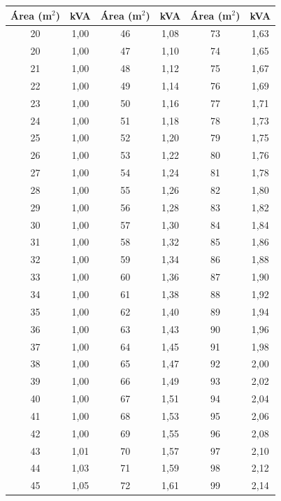 \documentclass[12pt,openright,oneside,a4paper,brazil]{abntex2}
\begin{document}
\begin{table}[H]
\begin{tabular}{c| c | c | c | c | c}
        \textbf{Área (m$^2$)} & \textbf{kVA} & \textbf{Área (m$^2$)} & \textbf{kVA} & \textbf{Área (m$^2$)} & \textbf{kVA} \rule{0pt}{15pt} \\
        \hline
        20 & 1,00 & 46 & 1,08 & 73 & 1,63 \\ \hline
        20 & 1,00 & 47 & 1,10 & 74 & 1,65 \\ \hline
        21 & 1,00 & 48 & 1,12 & 75 & 1,67 \\ \hline
        22 & 1,00 & 49 & 1,14 & 76 & 1,69 \\ \hline
        23 & 1,00 & 50 & 1,16 & 77 & 1,71 \\ \hline
        24 & 1,00 & 51 & 1,18 & 78 & 1,73 \\ \hline
        25 & 1,00 & 52 & 1,20 & 79 & 1,75 \\ \hline
        26 & 1,00 & 53 & 1,22 & 80 & 1,76 \\ \hline
        27 & 1,00 & 54 & 1,24 & 81 & 1,78 \\ \hline
        28 & 1,00 & 55 & 1,26 & 82 & 1,80 \\ \hline
        29 & 1,00 & 56 & 1,28 & 83 & 1,82 \\ \hline
        30 & 1,00 & 57 & 1,30 & 84 & 1,84 \\ \hline
        31 & 1,00 & 58 & 1,32 & 85 & 1,86 \\ \hline
        32 & 1,00 & 59 & 1,34 & 86 & 1,88 \\ \hline 
        33 & 1,00 & 60 & 1,36 & 87 & 1,90 \\ \hline
        34 & 1,00 & 61 & 1,38 & 88 & 1,92 \\ \hline
        35 & 1,00 & 62 & 1,40 & 89 & 1,94 \\ \hline
        36 & 1,00 & 63 & 1,43 & 90 & 1,96 \\ \hline
        37 & 1,00 & 64 & 1,45 & 91 & 1,98 \\ \hline
        38 & 1,00 & 65 & 1,47 & 92 & 2,00 \\ \hline
        39 & 1,00 & 66 & 1,49 & 93 & 2,02 \\ \hline
        40 & 1,00 & 67 & 1,51 & 94 & 2,04 \\ \hline
        41 & 1,00 & 68 & 1,53 & 95 & 2,06 \\ \hline
        42 & 1,00 & 69 & 1,55 & 96 & 2,08 \\ \hline
        43 & 1,01 & 70 & 1,57 & 97 & 2,10 \\ \hline
        44 & 1,03 & 71 & 1,59 & 98 & 2,12 \\ \hline
        45 & 1,05 & 72 & 1,61 & 99 & 2,14 \\ 
        \hline
        \end{tabular}%
        
        \vspace{0.15cm}

\end{table}
\end{document}
